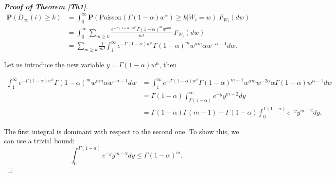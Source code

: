 \documentclass[11pt, reqno]{amsart}
\numberwithin{equation}{section}
\theoremstyle{plain} %
\theoremstyle{definition} %
\newcommand{\prob}{\mathbf{P}}
\begin{document}
\begin{proof}[{\bf Proof of Theorem \ref{Th1}}]
\begin{equation}
\begin{split}
    \prob(D_{\infty}(i)\ge  k) &= \int_0^{\infty} \prob( \textrm{Poisson}\left(\Gamma(1-\alpha) w^{\alpha}\right) \ge k | W_i = w) \; F_{W_i}(dw)\\
    &= \int_0^{\infty}\sum_{m\ge k} \frac{e^{-\Gamma(1-\alpha) w^\alpha}\Gamma(1-\alpha)^{m}w^{\alpha m} }{m!} \; F_{W_i}(dw) \\
    &= \sum_{m\ge k} \frac{1}{m!} \int_1^{\infty} e^{-\Gamma(1-\alpha) w^\alpha}\Gamma(1-\alpha)^{m}w^{\alpha m} \alpha w^{-\alpha-1} dw.
    \end{split}
\end{equation}

%
Let us introduce the new variable $ y =\Gamma(1-\alpha) w^\alpha$, then

\begin{align}
\int_1^{\infty}  e^{-\Gamma(1-\alpha) w^\alpha}\Gamma(1-\alpha)^{m}w^{\alpha m}\alpha w^{-\alpha-1}dw&=\int_{1}^\infty e^{-\Gamma(1-\alpha) w^\alpha}\Gamma(1-\alpha)^{m-1}w^{\alpha m} w^{-2\alpha} \alpha  \Gamma(1-\alpha) w^{\alpha-1} dw\nonumber\\
&=\Gamma(1-\alpha)\int_{\Gamma(1-\alpha)}^\infty e^{-y} y^{m-2} dy \nonumber\\
&=\Gamma(1-\alpha) \Gamma(m-1)- \Gamma(1-\alpha)\int_0^{\Gamma(1-\alpha)}e^{-y} y^{m-2} dy. \label{eq:gamma1}
\end{align}

The first integral is dominant with respect to the second one.  To show this, we can use a trivial bound:
$$\int_0^{\Gamma(1-\alpha)} e^{-y}y^{m-2}dy \leq \Gamma(1-\alpha)^{m}.$$


\end{proof}
\end{document}
